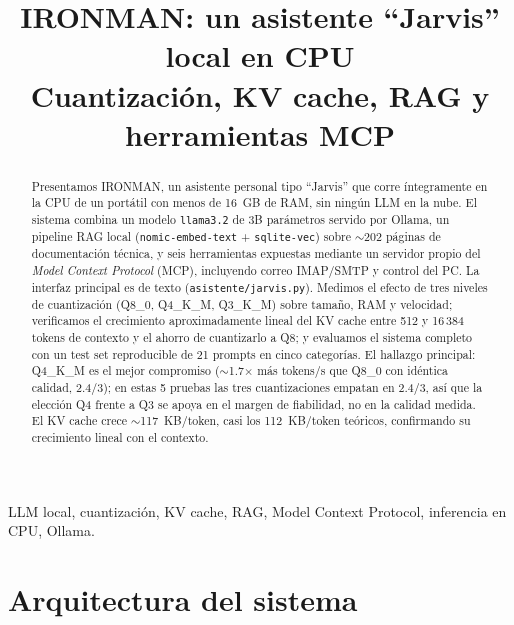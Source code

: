 \documentclass[conference]{IEEEtran}
\begin{document}
\title{IRONMAN: un asistente ``Jarvis'' local en CPU\\
\large Cuantización, KV cache, RAG y herramientas MCP}

\author{
}

\maketitle

\begin{abstract}
Presentamos IRONMAN, un asistente personal tipo ``Jarvis'' que corre
íntegramente en la CPU de un portátil con menos de 16~GB de RAM, sin ningún
LLM en la nube. El sistema combina un modelo \texttt{llama3.2} de 3B
parámetros servido por Ollama, un pipeline RAG local
(\texttt{nomic-embed-text} + \texttt{sqlite-vec}) sobre $\sim$202 páginas de
documentación técnica, y seis herramientas expuestas mediante un servidor
propio del \emph{Model Context Protocol} (MCP), incluyendo correo IMAP/SMTP y
control del PC. La interfaz principal es de texto (\texttt{asistente/jarvis.py}).
Medimos el efecto de tres niveles de cuantización (Q8\_0, Q4\_K\_M, Q3\_K\_M)
sobre tamaño, RAM y velocidad; verificamos el crecimiento aproximadamente
lineal del KV cache entre 512 y 16\,384 tokens de contexto y el ahorro de
cuantizarlo a Q8; y evaluamos el sistema completo con un test set reproducible
de 21 prompts en cinco categorías. El hallazgo principal: Q4\_K\_M es el mejor
compromiso ($\sim$1.7$\times$ más tokens/s que Q8\_0 con idéntica calidad,
2.4/3); en estas 5 pruebas las tres cuantizaciones empatan en 2.4/3, así que la
elección Q4 frente a Q3 se apoya en el margen de fiabilidad, no en la calidad
medida. El KV cache crece $\sim$117~KB/token, casi los 112~KB/token teóricos,
confirmando su crecimiento lineal con el contexto.
\end{abstract}

\begin{IEEEkeywords}
LLM local, cuantización, KV cache, RAG, Model Context Protocol, inferencia en
CPU, Ollama.
\end{IEEEkeywords}

\section{Arquitectura del sistema}
\end{document}
